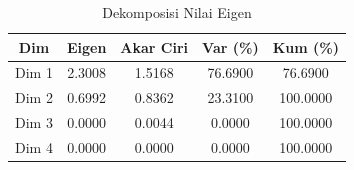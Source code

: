\begin{table}[H]
\centering
\caption{Dekomposisi Nilai Eigen} \label{tab:eigen}
\begin{tabular}{|c|c|c|c|c|}
\hline
\textbf{Dim} & \textbf{Eigen} & \textbf{Akar Ciri} & \textbf{Var (\%)} & \textbf{Kum (\%)} \\
\hline
Dim 1 & 2.3008 & 1.5168 & 76.6900 & 76.6900 \\
Dim 2 & 0.6992 & 0.8362 & 23.3100 & 100.0000 \\
Dim 3 & 0.0000 & 0.0044 & 0.0000 & 100.0000 \\
Dim 4 & 0.0000 & 0.0000 & 0.0000 & 100.0000 \\
\hline
\end{tabular}
\end{table}